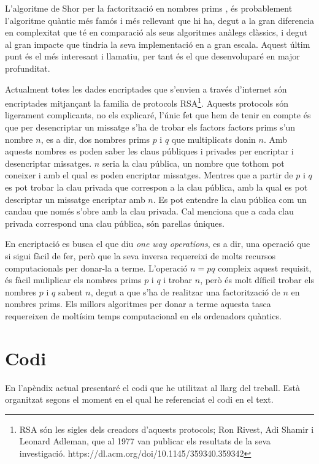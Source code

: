L'algoritme de Shor per la factorització en nombres prims \cite{Shor_97}, és probablement l'algoritme quàntic més famós i més rellevant que hi ha, degut a la gran diferencia en complexitat que té en comparació als seus algoritmes anàlegs clàssics, i degut al gran impacte que tindria la seva implementació en a gran escala. Aquest últim punt és el més interesant i llamatiu, per tant és el que desenvoluparé en major profunditat. 

Actualment totes les dades encriptades que s'envien a través d'internet són encriptades mitjançant la familia de protocols RSA\footnote{RSA són les sigles dels creadors d'aquests protocols; Ron Rivest, Adi Shamir i Leonard Adleman, que al 1977 van publicar els resultats de la seva investigació.  https://dl.acm.org/doi/10.1145/359340.359342}. Aquests protocols són ligerament complicants, no els explicaré, l'únic fet que hem de tenir en compte és que per desencriptar un missatge s'ha de trobar els factors factors prims s'un nombre $n$, es a dir, dos nombres prims $p$ i $q$ que multiplicats donin $n$. Amb aquests nombres es poden saber les claus públiques i privades per encriptar i desencriptar missatges. $n$ seria la clau pública, un nombre que tothom pot coneixer i amb el qual es poden encriptar missatges. Mentres que a partir de $p$ i $q$ es pot trobar la clau privada que correspon a la clau pública, amb la qual es pot descriptar un missatge encriptar amb $n$. Es pot entendre la clau pública com un candau que només s'obre amb la clau privada. Cal menciona que a cada clau privada correspond una clau pública, són parellas úniques.   

En encriptació es busca el que diu \textit{one way operations}, es a dir, una operació que si sigui fàcil de fer, però que la seva inversa requereixi de molts recursos computacionals per donar-la a terme. L'operació $n = pq$ compleix aquest requisit, és fàcil muliplicar els nombres prims $p$ i $q$ i trobar $n$, però és molt díficil trobar els nombres $p$ i $q$ sabent $n$, degut a que s'ha de realitzar una factorització de $n$ en nombres prims. Els millors algoritmes per donar a terme aquesta tasca requereixen de moltísim temps computacional en els ordenadors quàntics. 

\chapter{Codi}
En l'apèndix actual presentaré el codi que he utilitzat al llarg del treball. Està organitzat segons el moment en el qual he referenciat el codi en el text. 

